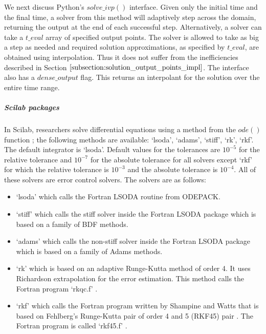 We next discuss Python's $solve\_ivp()$ interface. Given only the initial time and the final time, a solver from this method will adaptively step across the domain, returning the output at the end of each successful step. Alternatively, a solver can take a $t\_eval$ array of specified output points. The solver is allowed to take as big a step as needed and required solution approximations, as specified by $t\_eval$, are obtained using interpolation. Thus it does not suffer from the inefficiencies described in Section $\ref{subsection:solution_output_points_impl}$. The interface also has a $dense\_output$ flag. This returns an interpolant for the solution over the entire time range.

\subparagraph{Scilab packages}
In Scilab, researchers solve differential equations using a method from the $ode()$ function \cite{campbell2010modeling}; the following methods are available: `lsoda', `adams', `stiff', `rk', `rkf'. The default integrator is `lsoda'.
Default values for the tolerances are $10^{-5}$ for the relative tolerance and $10^{-7}$ for the absolute tolerance for all solvers except `rkf' for which the relative tolerance is $10^{-3}$ and the absolute tolerance is $10^{-4}$. All of these solvers are error control solvers. The solvers are as follows:

\begin{itemize}
\item `lsoda' which calls the Fortran LSODA routine from ODEPACK. 

\item `stiff' which calls the stiff solver inside the Fortran LSODA package which is based on a family of BDF methods.

\item `adams' which calls the non-stiff solver inside the Fortran LSODA package which is based on a family of Adams methods.

\item `rk' which is based on an adaptive Runge-Kutta method of order 4. It uses Richardson extrapolation \cite{MR1261869} for the error estimation. This method calls the Fortran program `rkqc.f' \cite{scilabGithub}.

\item `rkf' which calls the Fortran program written by Shampine and Watts that is based on Fehlberg's Runge-Kutta pair of order 4 and 5 (RKF45) pair \cite{osti7318812}. The Fortran program is called `rkf45.f' \cite{scilabGithub}.
\end{itemize}

